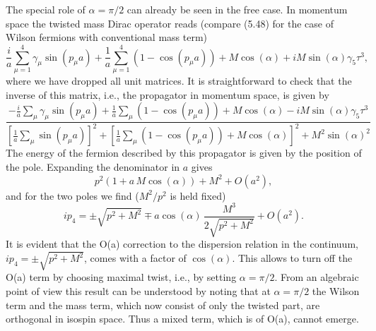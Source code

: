 The special role of $\alpha = \pi/2$ can already be seen in the free case. In
momentum space the twisted mass Dirac operator reads (compare (5.48) for the
case of Wilson fermions with conventional mass term)
\begin{equation}
  \frac{i}{a}\sum_{\mu=1}^{4}\gamma_\mu\sin(p_\mu a)
  + \frac{1}{a}\sum_{\mu=1}^{4}(1-\cos(p_\mu a))
  + M\cos(\alpha) + iM\sin(\alpha)\gamma_5\tau^3 ,
\end{equation}
where we have dropped all unit matrices. It is straightforward to check that
the inverse of this matrix, i.e., the propagator in momentum space, is given
by
\begin{equation}
  \frac{-\frac{i}{a}\sum_\mu\gamma_\mu\sin(p_\mu a)
  + \frac{1}{a}\sum_\mu(1-\cos(p_\mu a)) + M\cos(\alpha)
  - iM\sin(\alpha)\gamma_5\tau^3}
  {\left[\frac{1}{a}\sum_\mu\sin(p_\mu a)\right]^2
  + \left[\frac{1}{a}\sum_\mu(1-\cos(p_\mu a)) + M\cos(\alpha)\right]^2
  + M^2\sin(\alpha)^2}
\end{equation}
The energy of the fermion described by this propagator is given by the
position of the pole. Expanding the denominator in $a$ gives
\begin{equation}
  p^2\left(1 + a\,M\cos(\alpha)\right) + M^2 + O(a^2) ,
\end{equation}
and for the two poles we find ($M^2/p^2$ is held fixed)
\begin{equation}
  ip_4 = \pm\sqrt{p^2 + M^2}
  \mp a\cos(\alpha)\,\frac{M^3}{2\sqrt{p^2 + M^2}} + O(a^2) .
\end{equation}
It is evident that the O(a) correction to the dispersion relation in the
continuum, $ip_4 = \pm\sqrt{p^2 + M^2}$, comes with a factor of $\cos(\alpha)$.
This allows to turn off the O(a) term by choosing maximal twist, i.e., by
setting $\alpha = \pi/2$. From an algebraic point of view this result can be
understood by noting that at $\alpha = \pi/2$ the Wilson term and the mass
term, which now consist of only the twisted part, are orthogonal in isospin
space. Thus a mixed term, which is of O(a), cannot emerge.

